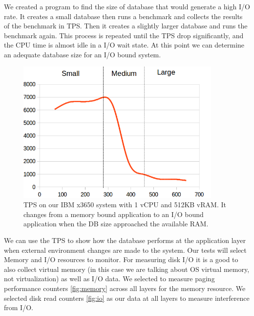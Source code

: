 We created a program to find the size of database that would generate a high I/O rate.  It creates a small database then runs a benchmark and collects the results of the benchmark in TPS.  Then it creates a slightly larger database and runs the benchmark again.  This process is repeated until the TPS drop significantly, and the CPU time is almost idle in a I/O wait state.  At this point we can determine an adequate database size for an I/O bound system.

\begin{figure}[!h]
  \begin{center}
  \includegraphics[width=4in]{images/SmallScale.png}
  \caption{TPS on our IBM x3650 system with 1 vCPU and 512KB vRAM. It changes from a memory bound application to an I/O bound application when the DB size approached the available RAM.}
  \label{smallIO}
  \end{center}
\end{figure}

We can use the TPS to show how the database performs at the application layer when external environment changes are made to the system.  Our tests will select Memory and I/O resources to monitor.  For measuring disk I/O it is a good to also collect virtual memory (in this case we are talking about OS virtual memory, not virtualization) as well as I/O data.  We selected to measure paging performance counters \ref{fig:memory} across all layers for the memory resource.  We selected disk read counters \ref{fig:io} as our data at all layers to measure interference from I/O. 

